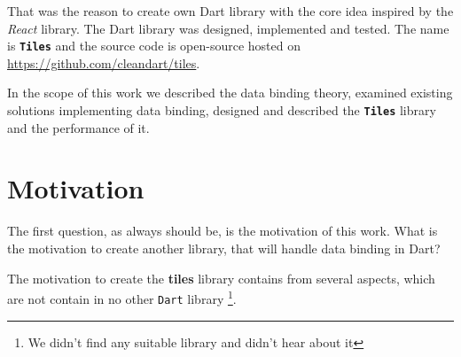 \documentclass[oneside, 12pt]{book}
\newcommand{\tiles}[0]{\textbf{\texttt{Tiles}} }
\newcommand{\react}[0]{\textit{React} }
\begin{document}
That was the reason to create own Dart library with the core idea inspired by the \react library. 
The Dart library was designed, implemented and tested. 
The name is \tiles and the source code is open-source hosted on \url{https://github.com/cleandart/tiles}.

In the scope of this work we described the data binding theory, 
examined existing solutions implementing data binding, 
designed and described the \tiles library and the performance of it.



\pagestyle{headings}
\chapter{Motivation}\label{chap:motivation}

The first question, as always should be, is the motivation of this work. 
What is the motivation to create another library, that will handle data binding in Dart?

The motivation to create the \textbf{tiles} library contains from several aspects, 
which are not contain in no other \texttt{Dart} library
\footnote{We didn't find any suitable library and didn't hear about it}.
\end{document}

